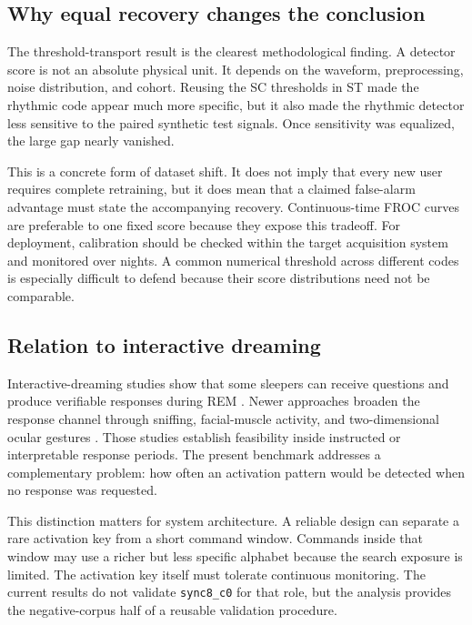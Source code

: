 \documentclass[10pt,twocolumn]{article}
\begin{document}
\subsection{Why equal recovery changes the conclusion}

The threshold-transport result is the clearest methodological finding. A detector score is not an absolute physical unit. It depends on the waveform, preprocessing, noise distribution, and cohort. Reusing the SC thresholds in ST made the rhythmic code appear much more specific, but it also made the rhythmic detector less sensitive to the paired synthetic test signals. Once sensitivity was equalized, the large gap nearly vanished.

This is a concrete form of dataset shift. It does not imply that every new user requires complete retraining, but it does mean that a claimed false-alarm advantage must state the accompanying recovery. Continuous-time FROC curves are preferable to one fixed score because they expose this tradeoff. For deployment, calibration should be checked within the target acquisition system and monitored over nights. A common numerical threshold across different codes is especially difficult to defend because their score distributions need not be comparable.

\subsection{Relation to interactive dreaming}

Interactive-dreaming studies show that some sleepers can receive questions and produce verifiable responses during REM \citep{konkoly2021,turker2023}. Newer approaches broaden the response channel through sniffing, facial-muscle activity, and two-dimensional ocular gestures \citep{konkoly2026,raduga2025,amo2025}. Those studies establish feasibility inside instructed or interpretable response periods. The present benchmark addresses a complementary problem: how often an activation pattern would be detected when no response was requested.

This distinction matters for system architecture. A reliable design can separate a rare activation key from a short command window. Commands inside that window may use a richer but less specific alphabet because the search exposure is limited. The activation key itself must tolerate continuous monitoring. The current results do not validate \texttt{sync8\_c0} for that role, but the analysis provides the negative-corpus half of a reusable validation procedure.
\end{document}
